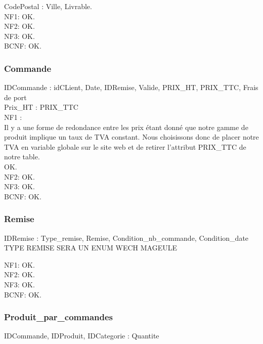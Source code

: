 \documentclass[a4paper, 12pt]{report}
\begin{document}
\begin{spacing}{1.2}
CodePostal : Ville, Livrable.\\

NF1: OK.\\
NF2: OK.\\
NF3: OK.\\
BCNF: OK.\\

\textcolor{colortitre3}{\subsubsection*{Commande}}

IDCommande : idCLient, Date, IDRemise, Valide, PRIX\_HT, PRIX\_TTC, Frais de port\\
Prix\_HT : PRIX\_TTC\\

NF1 : \\
Il y a une forme de redondance entre les prix étant donné que notre gamme de produit implique un taux de TVA constant. Nous choisissons donc de placer notre TVA en variable globale sur le site web et de retirer l'attribut PRIX\_TTC de notre table.\\

OK.\\

NF2: OK.\\
NF3: OK.\\
BCNF: OK.\\

\textcolor{colortitre3}{\subsubsection*{Remise}}

IDRemise : Type\_remise, Remise, Condition\_nb\_commande, Condition\_date\\

TYPE REMISE SERA UN ENUM WECH MAGEULE



NF1: OK.\\
NF2: OK.\\
NF3: OK.\\
BCNF: OK.\\


\textcolor{colortitre3}{\subsubsection*{Produit\_par\_commandes}}

IDCommande, IDProduit, IDCategorie : Quantite\\


\end{spacing}
\end{document}
